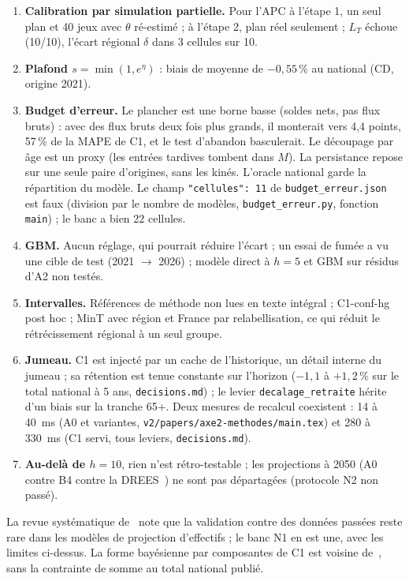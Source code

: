 \begin{enumerate}
    uniformes ; à la commune, $<40$ = 25--39 ans\suppose.
  \item \textbf{Calibration par simulation partielle.} Pour l'APC à l'étape 1, un seul plan et 40 jeux avec
    $\theta$ ré-estimé ; à l'étape 2, plan réel seulement ; $L_T$ échoue (10/10\mesure), l'écart régional
    $\delta$ dans 3 cellules sur 10\mesure.
  \item \textbf{Plafond $s = \min(1, e^{\eta})$} : biais de moyenne de $-0{,}55\,\%$\mesure{} au national
    (CD, origine 2021).
  \item \textbf{Budget d'erreur.} Le plancher est une borne basse (soldes nets, pas flux bruts) : avec des flux
    bruts deux fois plus grands, il monterait vers 4,4\suppose{} points, 57\,\%\derive{} de la MAPE de C1, et
    le test d'abandon basculerait. Le découpage par âge est un proxy (les entrées tardives tombent dans $M$).
    La persistance repose sur une seule paire d'origines, sans les kinés. L'oracle national garde la
    répartition du modèle. Le champ \texttt{"cellules": 11} de \texttt{budget\_erreur.json} est faux (division
    par le nombre de modèles, \texttt{budget\_erreur.py}, fonction \texttt{main}) ; le banc a bien 22 cellules.
  \item \textbf{GBM.} Aucun réglage, qui pourrait réduire l'écart ; un essai de fumée a vu une cible de test
    (2021 $\to$ 2026) ; modèle direct à $h = 5$ et GBM sur résidus d'A2 non testés.
  \item \textbf{Intervalles.} Références de méthode non lues en texte intégral ; C1-conf-hg post hoc ; MinT
    avec région et France par relabellisation, ce qui réduit le rétrécissement régional à un seul groupe.
  \item \textbf{Jumeau.} C1 est injecté par un cache de l'historique, un détail interne du jumeau ; sa
    rétention est tenue constante sur l'horizon ($-1{,}1$ à $+1{,}2\,\%$\mesure{} sur le total national à
    5 ans, \texttt{decisions.md}) ; le levier \texttt{decalage\_retraite} hérite d'un biais sur la tranche 65+.
    Deux mesures de recalcul coexistent : 14 à 40\mesure{}~ms (A0 et variantes,
    \texttt{v2/papers/axe2-methodes/main.tex}) et 280 à 330\mesure{}~ms (C1 servi, tous leviers,
    \texttt{decisions.md}).
  \item \textbf{Au-delà de $h = 10$}, rien n'est rétro-testable ; les projections à 2050 (A0 contre B4 contre
    la DREES~\cite{b-drees2021dd76}) ne sont pas départagées (protocole N2 non passé).
\end{enumerate}
La revue systématique de~\cite{b-lee2024hrh} note que la validation contre des données passées reste rare
dans les modèles de projection d'effectifs ; le banc N1 en est une, avec les limites ci-dessus. La forme
bayésienne par composantes de C1 est voisine de~\cite{b-alexander2021bayesian}, sans la contrainte de somme
au total national publié.
\endgroup
